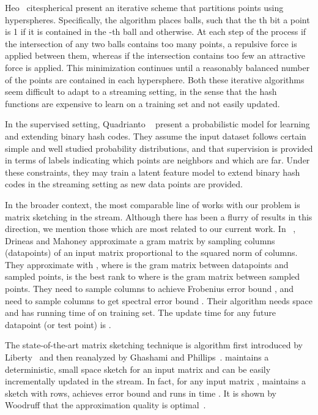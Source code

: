 \documentclass{sig-alternate}
\begin{document}
Heo \etal ~cite{spherical} present an iterative scheme that partitions points using hyperspheres. Specifically, the algorithm places  balls, such that the th bit a point  is 1 if it is contained in the -th ball and  otherwise. At each step of the process if the intersection of any two balls contains too many points, a repulsive force is applied between them, whereas if the intersection contains too few an attractive force is applied. This minimization continues until a reasonably balanced number of the points are contained in each hypersphere.  Both these iterative algorithms seem difficult to adapt to a streaming setting, in the sense that the hash functions are expensive to learn on a training set and not easily updated.

In the supervised setting, Quadrianto \etal~\cite{quadrianto} present a probabilistic model for learning and extending binary hash codes. They assume the input dataset follows certain simple and well studied probability distributions, and that supervision is provided in terms of labels indicating which points are neighbors and which are far. Under these constraints, they may train a latent feature model to extend binary hash codes in the streaming setting as new data points are provided.

In the broader context, the most comparable line of works with our problem is matrix sketching in the stream.
Although there has been a flurry of results in this direction\cite{numerical,ghashami1,Lib12}, we mention those which are most related to our current work.
In ~\cite{drineas2005nystrom}, Drineas and Mahoney approximate a gram matrix  by sampling  columns (datapoints) of an input matrix  proportional to the squared norm of columns. 
They approximate  with , where  is the gram matrix between  datapoints and  sampled points,  is the best rank  to  where  is the gram matrix between sampled points. 
They need to sample  columns to achieve Frobenius error bound , and need to sample  columns to get spectral error bound . Their algorithm needs  space and has running time of  on training set. The update time for any future datapoint (or test point) is .

The state-of-the-art matrix sketching technique is \FD algorithm first introduced by Liberty~\cite{Lib12} and then reanalyzed by Ghashami and Phillips~\cite{ghashami1}. \FD  maintains a deterministic, small space sketch for an input matrix and can be easily incrementally updated in the stream. In fact, for any input matrix , \FD maintains a sketch  with  rows, achieves error bound  and runs in time . It is shown by Woodruff that the approximation quality is optimal~\cite{lowerbound}. 
\end{document}
